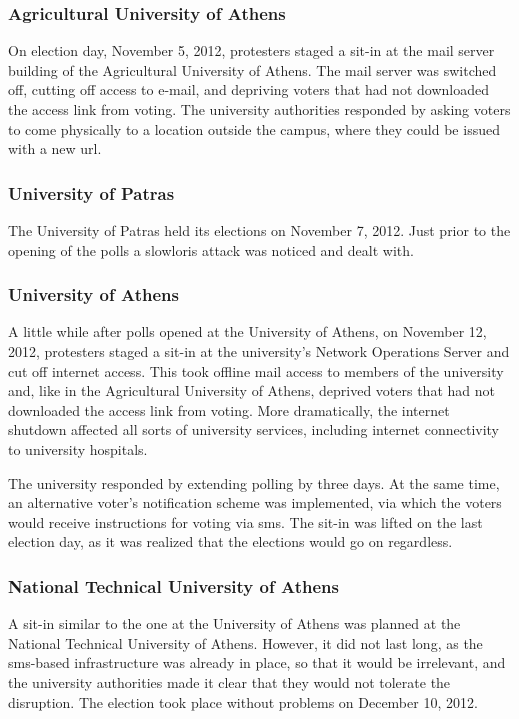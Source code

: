\documentclass[letterpaper,10pt]{article}
\begin{document}
\subsubsection{Agricultural University of Athens}

On election day, November 5, 2012, protesters staged a sit-in at the
mail server building of the Agricultural University of Athens. The
mail server was switched off, cutting off access to e-mail, and
depriving voters that had not downloaded the access link from voting.
The university authorities responded by asking voters to come
physically to a location outside the campus, where they could be
issued with a new {\sc url}.

\subsubsection{University of Patras}

The University of Patras held its elections on November 7, 2012. Just
prior to the opening of the polls a slowloris attack was noticed and
dealt with.

\subsubsection{University of Athens}

A little while after polls opened at the University of Athens, on
November 12, 2012, protesters staged a sit-in at the university's
Network Operations Server and cut off internet access. This took
offline mail access to members of the university and, like in the
Agricultural University of Athens, deprived voters that had not
downloaded the access link from voting. More dramatically, the
internet shutdown affected all sorts of university services, including
internet connectivity to university hospitals.

The university responded by extending polling by three days. At the
same time, an alternative voter's notification scheme was implemented,
via which the voters would receive instructions for voting via {\sc sms}.
The sit-in was lifted on the last election day, as it was realized
that the elections would go on regardless.

\subsubsection{National Technical University of Athens}

A sit-in similar to the one at the University of Athens was planned at
the National Technical University of Athens. However, it did not last
long, as the {\sc sms}-based infrastructure was already in place, so
that it would be irrelevant, and the university authorities made it
clear that they would not tolerate the disruption. The election took
place without problems on December 10, 2012.
\end{document}
